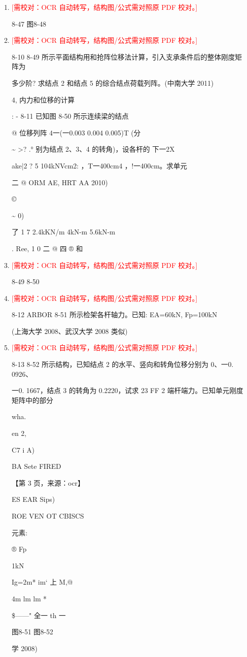 \documentclass[UTF8,12pt,a4paper,openany]{ctexbook}
\newcommand{\TODO}[1]{\textcolor{red}{[需校对：#1]}}
\begin{document}
\begin{enumerate}[label=\textbf{\arabic*.},leftmargin=2em]
\item \TODO{OCR 自动转写，结构图/公式需对照原 PDF 校对。}\par 8-47                                                                    图8-48
\item \TODO{OCR 自动转写，结构图/公式需对照原 PDF 校对。}\par 8-10 8-49 所示平面结构用和抢阵位移法计算，引入支承条件后的整体刚度矩阵为\par 多少阶? 求结点 2 和结点 5 的综合结点荷载列阵。(中南大学 2011)\par 4, 内力和位移的计算\par :      -          8-11 已知图 8-50 所示连续梁的结点\par @                   位移列阵 4一(一0.003 0.004 0.005)T (分\par \textasciitilde{}          >? .°             别为结点 2、3、4 的转角)，设各杆的 下一2X\par ake|2     ? 5           104kNVcm2: ，T一400cm4 ，!一400cm。求单元\par 二 @                  ORM AE, HRT AA 2010)\par ©\par \textasciitilde{}          0)\par 了 1                            7    2.4kKN/m    4kN-m     5.6kN-m\par .        Ree,                1 0    二      @    四         ®   和
\item \TODO{OCR 自动转写，结构图/公式需对照原 PDF 校对。}\par 8-49 8-50
\item \TODO{OCR 自动转写，结构图/公式需对照原 PDF 校对。}\par 8-12 ARBOR 8-51 所示检架各杆轴力。已知: EA=60kN, Fp=100kN\par (上海大学 2008、武汉大学 2008 类似)
\item \TODO{OCR 自动转写，结构图/公式需对照原 PDF 校对。}\par 8-13 8-52 所示结构，已知结点 2 的水平、竖向和转角位移分别为 0、一0. 0926、\par 一0. 1667，结点 3 的转角为 0.2220，试求 23 FF 2 端杆端力。已知单元刚度矩阵中的部分\par wha.\par en 2,\par C7 i A)\par BA Sete FIRED\par \par 【第 3 页，来源：ocr】\par ES EAR Sips)\par ROE VEN OT CBISCS\par 元素:\par ®      Fp\par 1kN\par Ig=2m*          im‘          上 M,@\par 4m                    lm       lm          *\par \$——"           全一 th 一\par 图8-51                     图8-52\par 学 2008)

\end{enumerate}
\end{document}

